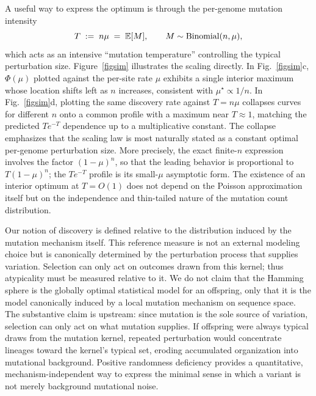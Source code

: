 \documentclass[9pt,twocolumn,oneside]{pnas-new}
\begin{document}
A useful way to express the optimum is through the per-genome mutation intensity
\[
T \;:=\; n\mu \;=\; \mathbb{E}[M],\qquad M\sim{\rm Binomial}(n,\mu),
\]
which acts as an intensive ``mutation temperature'' controlling the typical perturbation size. Figure~\ref{figsim} illustrates the scaling directly.
In Fig.~\ref{figsim}c, $\Phi(\mu)$ plotted against the per-site rate $\mu$ exhibits a single interior maximum whose location shifts left as $n$ increases, consistent with $\mu^\star\propto 1/n$. In Fig.~\ref{figsim}d, plotting the same discovery rate against $T=n\mu$ collapses curves for different $n$ onto a common profile with a maximum near $T\approx 1$, matching the predicted $Te^{-T}$ dependence up to a multiplicative constant.
The collapse emphasizes that the scaling law is most naturally stated as a constant optimal per-genome perturbation size.
More precisely, the exact finite-$n$ expression involves the factor $(1-\mu)^n$, so that the leading behavior is proportional to $T(1-\mu)^n$; the  $T e^{-T}$ profile is its small-$\mu$ asymptotic form. The existence of an interior optimum at $T=O(1)$ does not depend on the Poisson approximation itself but on the independence and thin-tailed nature of the mutation count distribution.

Our notion of discovery is defined relative to the distribution induced by the mutation mechanism itself. This reference measure is not an external modeling choice but is canonically determined by the perturbation process that supplies variation. Selection can only act on outcomes drawn from this kernel; thus atypicality must be measured relative to it.  We do not claim that the Hamming sphere is the globally optimal statistical model for an offspring, only that it is the model canonically induced by a local mutation mechanism on sequence space. The substantive claim is upstream: since mutation is the sole source of variation, selection can only act on what mutation supplies. If offspring were always typical draws from the mutation kernel, repeated perturbation would concentrate lineages toward the kernel's typical set, eroding accumulated organization into mutational background. Positive randomness deficiency provides a quantitative, mechanism-independent way to express the minimal sense in which a variant is not merely background mutational noise.

\end{document}
